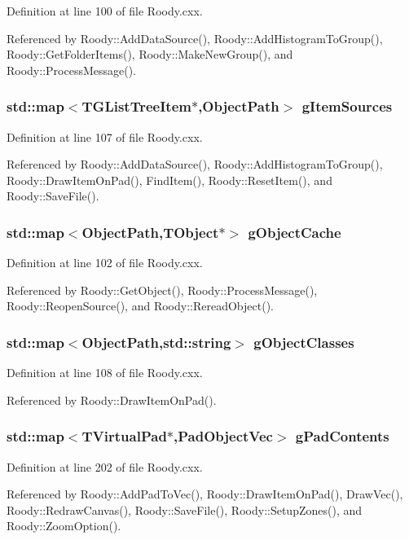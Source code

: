 Definition at line 100 of file Roody.cxx.

Referenced by Roody::AddDataSource(), Roody::AddHistogramToGroup(), Roody::GetFolderItems(), Roody::MakeNewGroup(), and Roody::ProcessMessage().
\subsubsection[{gItemSources}]{\setlength{\rightskip}{0pt plus 5cm}std::map$<$TGListTreeItem$\ast$,ObjectPath$>$ {\bf gItemSources}}\label{Roody_8cxx_af77fd30c760f8c2c99d2f9b8e1f99c00}


Definition at line 107 of file Roody.cxx.

Referenced by Roody::AddDataSource(), Roody::AddHistogramToGroup(), Roody::DrawItemOnPad(), FindItem(), Roody::ResetItem(), and Roody::SaveFile().
\subsubsection[{gObjectCache}]{\setlength{\rightskip}{0pt plus 5cm}std::map$<$ObjectPath,TObject$\ast$$>$ {\bf gObjectCache}}\label{Roody_8cxx_a82dfd284f9a1cee6b3b751ed52c8fcc2}


Definition at line 102 of file Roody.cxx.

Referenced by Roody::GetObject(), Roody::ProcessMessage(), Roody::ReopenSource(), and Roody::RereadObject().
\subsubsection[{gObjectClasses}]{\setlength{\rightskip}{0pt plus 5cm}std::map$<$ObjectPath,std::string$>$ {\bf gObjectClasses}}\label{Roody_8cxx_ab15243e54e971d543df4cc286b5733d0}


Definition at line 108 of file Roody.cxx.

Referenced by Roody::DrawItemOnPad().
\subsubsection[{gPadContents}]{\setlength{\rightskip}{0pt plus 5cm}std::map$<$TVirtualPad$\ast$,{\bf PadObjectVec}$>$ {\bf gPadContents}}\label{Roody_8cxx_aaa13e34ee096e30cf2cc881c4ef61afe}


Definition at line 202 of file Roody.cxx.

Referenced by Roody::AddPadToVec(), Roody::DrawItemOnPad(), DrawVec(), Roody::RedrawCanvas(), Roody::SaveFile(), Roody::SetupZones(), and Roody::ZoomOption().